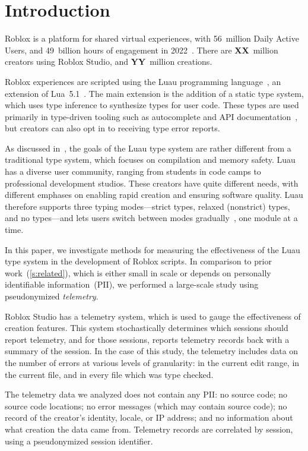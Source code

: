 \documentclass[english,submission,cleveref]{programming}
\begin{document}
\section{Introduction}
\label{s:introduction}

{Roblox} is a platform for {shared virtual experiences},
with 56~million Daily Active Users, and 49~billion hours of engagement in
2022~\cite{roblox-quarterly-results}.
There are \textbf{XX}~million creators using {Roblox Studio},
and \textbf{YY}~million creations.

{Roblox experiences} are scripted using the 
{Luau} programming language~\cite{luau-lang.org},
an extension of {Lua~5.1~\cite{lua}}.
The main extension is the addition of a static type system, which uses
type inference to synthesize types for user code. These types
are used primarily in type-driven tooling such as autocomplete
and API documentation~\cite{luau-autocomplete},
but creators can also opt in to receiving type error reports.

As discussed in~\cite{bfj-hatra-2021},
the goals of the {Luau} type system are rather different from
a traditional type system, which focuses on compilation and memory safety.
{Luau} has a diverse user community, ranging from
students in code camps to professional development studios. These
creators have quite different needs, with different emphases on
enabling rapid creation and ensuring software quality.
{Luau} therefore supports three typing modes---strict types,
relaxed (nonstrict) types, and no types---and lets users switch
between modes gradually~\cite{st-sfp-2006,tfffgksst-snapl-2017}, one module at a time.

In this paper, we investigate methods for measuring the effectiveness
of the {Luau} type system in the development of {Roblox} scripts.
In comparison to prior work~(\cref{s:related}), which is either small in scale
or depends on personally identifiable information~(PII),
we performed a large-scale study using pseudonymized \emph{telemetry}.

{Roblox Studio} has a telemetry system, which is used to gauge
the effectiveness of creation features. This system stochastically
determines which sessions should report telemetry, and for those
sessions, reports telemetry records back with a summary of the
session. In the case of this study, the telemetry includes data on the
number of errors at various levels of granularity: in the current edit
range, in the current file, and in every file which was type
checked.

The telemetry data we analyzed does not contain any PII:
no source code;
no source code locations;
no error messages (which may contain source code);
no record of the creator's identity, locale, or IP address;
and no information about what creation the data came from.
Telemetry records are correlated by session, using a pseudonymized
session identifier.
\end{document}
